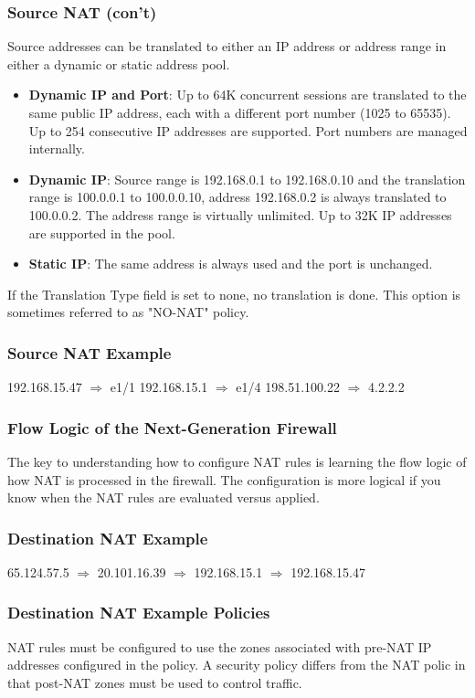 \subsubsection{Source NAT (con't)}
Source addresses can be translated to either an IP address or address range in either a dynamic or static address pool.
    \begin{itemize}
        \item \textbf{Dynamic IP and Port}:  Up to 64K concurrent sessions are translated to the same public IP address, each with a different port number (1025 to 65535). Up to 254 consecutive IP addresses are supported. Port numbers are managed internally.
        \item \textbf{Dynamic IP}:  Source range is 192.168.0.1 to 192.168.0.10 and the translation range is 100.0.0.1 to 100.0.0.10, address 192.168.0.2 is always translated to 100.0.0.2. The address range is virtually unlimited. Up to 32K IP addresses are supported in the pool.
        \item \textbf{Static IP}: The same address is always used and the port is unchanged.
    \end{itemize}
If the Translation Type field is set to none, no translation is done. This option is sometimes referred to as "NO-NAT" policy.

\subsubsection{Source NAT Example}
192.168.15.47 $\Rightarrow$ e1/1 192.168.15.1 $\Rightarrow$ e1/4 198.51.100.22 $\Rightarrow$ 4.2.2.2

\subsubsection{Flow Logic of the Next-Generation Firewall}
The key to understanding how to configure NAT rules is learning the flow logic of how NAT is processed in the firewall. The configuration is more logical if you know when the NAT rules are evaluated versus applied.

\subsubsection{Destination NAT Example}
65.124.57.5 $\Rightarrow$ 20.101.16.39 $\Rightarrow$ 192.168.15.1 $\Rightarrow$ 192.168.15.47

\subsubsection{Destination NAT Example Policies}
NAT rules must be configured to use the zones associated with pre-NAT IP addresses configured in the policy. A security policy differs from the NAT polic in that post-NAT zones must be used to control traffic.

